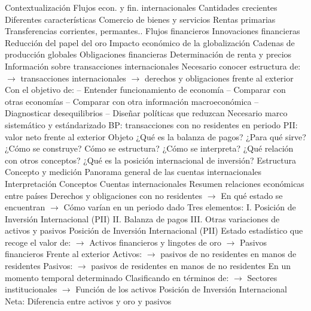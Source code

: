 \documentclass{nuevotema}
\begin{document}
\begin{esquemal}
	\1[] 
		\2 Contextualización
			\3 Flujos econ. y fin. internacionales
				\4 Cantidades crecientes
				\4 Diferentes características
				\4 Comercio de bienes y servicios
				\4 Rentas primarias
				\4 Transferencias corrientes, permantes..
				\4 Flujos financieros
				\4[] Innovaciones financieras
				\4[] Reducción del papel del oro
			\3 Impacto económico de la globalización
				\4 Cadenas de producción globales
				\4 Obligaciones financieras
				\4 Determinación de renta y precios
			\3 Información sobre transacciones internacionales
				\4 Necesario conocer estructura de:
				\4[] $\to$ transacciones internacionales
				\4[] $\to$ derechos y obligaciones frente al exterior
				\4[] Con el objetivo de:
				\4[] -- Entender funcionamiento de economía
				\4[] -- Comparar con otras economías
				\4[] -- Comparar con otra información macroeconómica
				\4[] -- Diagnosticar desequilibrios
				\4[] -- Diseñar políticas que reduzcan
				\4[$\then$] Necesario marco sistemático y estándarizado
				\4[$\then$] BP: transacciones con no residentes en periodo
				\4[$\then$] PII: valor neto frente al exterior
		\2 Objeto
			\3 ¿Qué es la balanza de pagos?
			\3 ¿Para qué sirve?
			\3 ¿Cómo se construye?
			\3 Cómo se estructura?
			\3 ¿Cómo se interpreta?
			\3 ¿Qué relación con otros conceptos?
			\3 ¿Qué es la posición internacional de inversión?
		\2 Estructura
			\3 Concepto y medición
			\3 Panorama general de las cuentas internacionales
			\3 Interpretación
	\1 
		\2 Conceptos
			\3 Cuentas internacionales
				\4 Resumen relaciones económicas entre países
				\4[] Derechos y obligaciones con no residentes
				\4[] $\to$ En qué estado se encuentran
				\4[] $\to$ Cómo varían en un periodo dado
				\4 Tres elementos:
				\4[] I. Posición de Inversión Internacional (PII)
				\4[] II. Balanza de pagos
				\4[] III. Otras variaciones de activos y pasivos
			\3 Posición de Inversión Internacional (PII)
				\4 Estado estadístico que recoge el valor de:
				\4[] $\to$ Activos financieros y lingotes de oro
				\4[] $\to$ Pasivos financieros
				\4 Frente al exterior
				\4[] Activos:
				\4[] $\to$ pasivos de no residentes en manos de residentes
				\4[] Pasivos:
				\4[] $\to$ pasivos de residentes en manos de no residentes
				\4 En un momento temporal determinado
				\4 Clasificando en términos de:
				\4[] $\to$ Sectores institucionales
				\4[] $\to$ Función de los activos
				\4 Posición de Inversión Internacional Neta:
				\4[] Diferencia entre activos y oro y pasivos

\end{esquemal}
\end{document}
